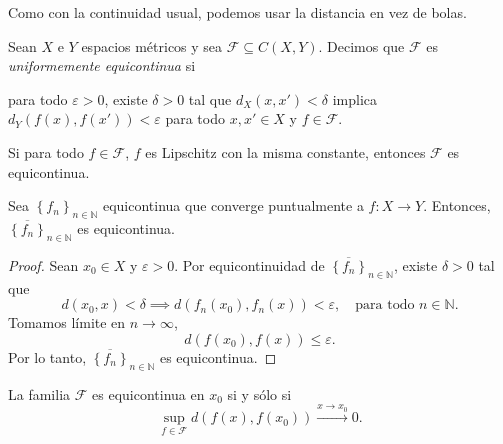 \begin{remark}
	Como con la continuidad usual, podemos usar la distancia en vez de bolas.
\end{remark}

\begin{definition}
	Sean $X$ e $Y$ espacios métricos y sea $\mathcal{F} \subseteq C(X, Y)$. Decimos que $\mathcal{F}$ es \emph{uniformemente equicontinua} si
	\begin{center}
		\begin{minipage}{0.9\linewidth}
			para todo $\varepsilon > 0$, existe $\delta > 0$ tal que $d_X(x, x') < \delta$ implica $d_Y(f(x), f(x')) < \varepsilon$ para todo $x, x' \in X$ y $f \in \mathcal{F}$.
		\end{minipage}
	\end{center}
\end{definition}

\begin{remark}
	Si para todo $f \in \mathcal{F}$, $f$ es Lipschitz con la misma constante, entonces $\mathcal{F}$ es equicontinua.
\end{remark}

\begin{proposition}
	Sea $\left\{ f_n \right\}_{n \in \mathbb{N}}$ equicontinua que converge puntualmente a $f : X \to Y$. Entonces, $\overline{\left\{ f_n \right\}}_{n \in \mathbb{N}}$ es equicontinua.
\end{proposition}

\begin{proof}
	Sean $x_0 \in X$ y $\varepsilon > 0$. Por equicontinuidad de $\overline{\left\{ f_n \right\}}_{n \in \mathbb{N}}$, existe $\delta > 0$ tal que
	\begin{equation*}
		d(x_0, x) < \delta \implies d(f_n(x_0), f_n(x)) < \varepsilon, \quad \text{para todo }n \in \mathbb{N}.
	\end{equation*}
	Tomamos límite en $n \to \infty$,
	\begin{equation*}
		d(f(x_0), f(x)) \leq \varepsilon.
	\end{equation*}
	Por lo tanto, $\overline{\left\{ f_n \right\}}_{n \in \mathbb{N}}$ es equicontinua.
\end{proof}

\begin{remark}
	La familia $\mathcal{F}$ es equicontinua en $x_0$ si y sólo si
	\begin{equation*}
		\sup_{f \in \mathcal{F}} d(f(x), f(x_0)) \xrightarrow{x \to x_0} 0.
	\end{equation*}
\end{remark}

